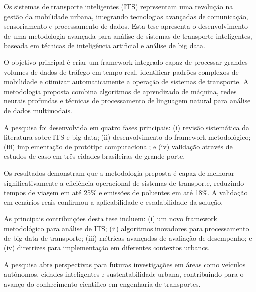 \documentclass[doutorado,onehalfspacing,12pt,hyperref]{UnB-PPGT}
\begin{document}
\begin{resumo}
Os sistemas de transporte inteligentes (ITS) representam uma revolução na gestão da mobilidade urbana, integrando tecnologias avançadas de comunicação, sensoriamento e processamento de dados. Esta tese apresenta o desenvolvimento de uma metodologia avançada para análise de sistemas de transporte inteligentes, baseada em técnicas de inteligência artificial e análise de big data.

O objetivo principal é criar um framework integrado capaz de processar grandes volumes de dados de tráfego em tempo real, identificar padrões complexos de mobilidade e otimizar automaticamente a operação de sistemas de transporte. A metodologia proposta combina algoritmos de aprendizado de máquina, redes neurais profundas e técnicas de processamento de linguagem natural para análise de dados multimodais.

A pesquisa foi desenvolvida em quatro fases principais: (i) revisão sistemática da literatura sobre ITS e big data; (ii) desenvolvimento do framework metodológico; (iii) implementação de protótipo computacional; e (iv) validação através de estudos de caso em três cidades brasileiras de grande porte.

Os resultados demonstram que a metodologia proposta é capaz de melhorar significativamente a eficiência operacional de sistemas de transporte, reduzindo tempos de viagem em até 25\% e emissões de poluentes em até 18\%. A validação em cenários reais confirmou a aplicabilidade e escalabilidade da solução.

As principais contribuições desta tese incluem: (i) um novo framework metodológico para análise de ITS; (ii) algoritmos inovadores para processamento de big data de transporte; (iii) métricas avançadas de avaliação de desempenho; e (iv) diretrizes para implementação em diferentes contextos urbanos.

A pesquisa abre perspectivas para futuras investigações em áreas como veículos autônomos, cidades inteligentes e sustentabilidade urbana, contribuindo para o avanço do conhecimento científico em engenharia de transportes.
\end{resumo}
\end{document}
